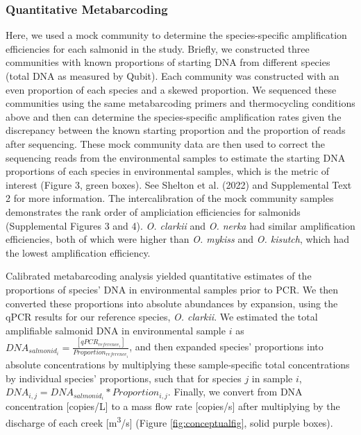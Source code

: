 \documentclass[
]{article}
\begin{document}
\hypertarget{quantitative-metabarcoding}{%
\subsubsection{Quantitative
Metabarcoding}\label{quantitative-metabarcoding}}

Here, we used a mock community to determine the species-specific
amplification efficiencies for each salmonid in the study. Briefly, we
constructed three communities with known proportions of starting DNA
from different species (total DNA as measured by Qubit). Each community
was constructed with an even proportion of each species and a skewed
proportion. We sequenced these communities using the same metabarcoding
primers and thermocycling conditions above and then can determine the
species-specific amplification rates given the discrepancy between the
known starting proportion and the proportion of reads after sequencing.
These mock community data are then used to correct the sequencing reads
from the environmental samples to estimate the starting DNA proportions
of each species in environmental samples, which is the metric of
interest (Figure 3, green boxes). See Shelton et al. (2022) and
Supplemental Text 2 for more information. The intercalibration of the
mock community samples demonstrates the rank order of ampliciation
efficiencies for salmonids (Supplemental Figures 3 and 4). \emph{O.
clarkii} and \emph{O. nerka} had similar amplification efficiencies,
both of which were higher than \emph{O. mykiss} and \emph{O. kisutch},
which had the lowest amplification efficiency.

Calibrated metabarcoding analysis yielded quantitative estimates of the
proportions of species' DNA in environmental samples prior to PCR. We
then converted these proportions into absolute abundances by expansion,
using the qPCR results for our reference species, \emph{O. clarkii}. We
estimated the total amplifiable salmonid DNA in environmental sample
\(i\) as
\(DNA_{salmonid_{i}} = \frac{[qPCR_{reference_{i}}]}{Proportion_{reference_{i}}}\),
and then expanded species' proportions into absolute concentrations by
multiplying these sample-specific total concentrations by individual
species' proportions, such that for species \(j\) in sample \(i\),
\(DNA_{i,j} = DNA_{salmonid_{i}} * Proportion_{i,j}\). Finally, we
convert from DNA concentration {[}copies/L{]} to a mass flow rate
{[}copies/s{]} after multiplying by the discharge of each creek
{[}m\textsuperscript{3}/s{]} (Figure \ref{fig:conceptualfig}, solid
purple boxes).
\end{document}
